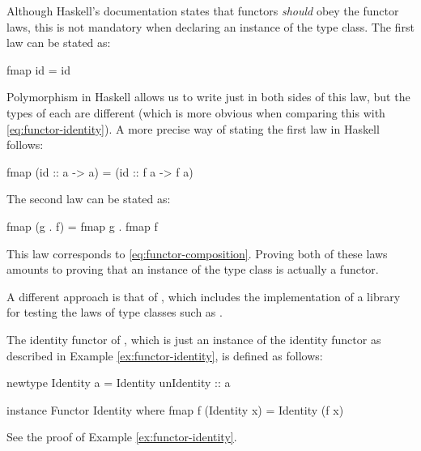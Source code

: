 Although Haskell's documentation  states that functors
\emph{should} obey the functor laws, this is not mandatory when
declaring an instance of the  type class. The
first law can be stated as:
\begin{codehaskell}
fmap id = id
\end{codehaskell}
Polymorphism in Haskell allows us to write just  in
both sides of this law, but the types of each  are
different (which is more obvious when comparing this with
\eqref{eq:functor-identity}). A more precise way of stating the first
law in Haskell follows:
\begin{codehaskell}
fmap (id :: a -> a) = (id :: f a -> f a)
\end{codehaskell}
The second law can be stated as:
\begin{codehaskell}
fmap (g . f) = fmap g . fmap f
\end{codehaskell}
This law corresponds to \eqref{eq:functor-composition}. Proving both
of these laws amounts to proving that an instance of the
 type class is actually a functor.

\begin{remark}

  A different approach is that of \parencite{jeuring-2012}, which
  includes the implementation of a library for testing the laws of
  type classes such as .

\end{remark}


\begin{example}
  \label{ex:functor-identity-haskell}

  The identity functor of \hask, which is just an instance of the
  identity functor as described in Example \ref{ex:functor-identity},
  is defined as follows:
  \begin{codehaskell}
newtype Identity a = Identity {unIdentity :: a}

instance Functor Identity where
  fmap f (Identity x) = Identity (f x)
  \end{codehaskell}


  See the proof of Example \ref{ex:functor-identity}.

\end{example}

